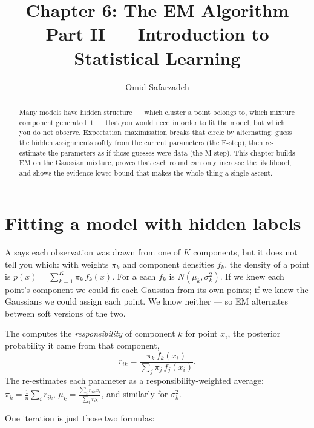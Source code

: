 \documentclass[11pt]{article}
\title{Chapter 6: The EM Algorithm \\ \large Part II --- Introduction to Statistical Learning}
\author{Omid Safarzadeh}
\date{}
\begin{document}
\maketitle

\begin{abstract}
\noindent
Many models have hidden structure --- which cluster a point belongs to, which
mixture component generated it --- that you would need in order to fit the
model, but which you do not observe. Expectation--maximisation breaks that
circle by alternating: guess the hidden assignments softly from the current
parameters (the E-step), then re-estimate the parameters as if those guesses
were data (the M-step). This chapter builds EM on the Gaussian mixture,
proves that each round can only increase the likelihood, and shows the
evidence lower bound that makes the whole thing a single ascent.
\end{abstract}

\tableofcontents

\section{Fitting a model with hidden labels}

A  says each observation was drawn from one of $K$
components, but it does not tell you which: with weights $\pi_k$ and component
densities $f_k$, the density of a point is
$p(x) = \sum_{k=1}^K \pi_k\, f_k(x)$. For a  each
$f_k$ is $N(\mu_k,\sigma_k^2)$. If we knew each point's component we could fit
each Gaussian from its own points; if we knew the Gaussians we could assign
each point. We know neither --- so EM alternates between soft versions of the
two.

\begin{definition}
The  computes the \emph{responsibility} of component $k$ for
point $x_i$, the posterior probability it came from that component,
\[
  r_{ik} = \frac{\pi_k\, f_k(x_i)}{\sum_{j} \pi_j\, f_j(x_i)}.
\]
The  re-estimates each parameter as a responsibility-weighted
average: $\pi_k = \tfrac1n\sum_i r_{ik}$, $\mu_k = \tfrac{\sum_i r_{ik}x_i}{\sum_i r_{ik}}$,
and similarly for $\sigma_k^2$.
\end{definition}

One iteration is just those two formulas:
\end{document}
